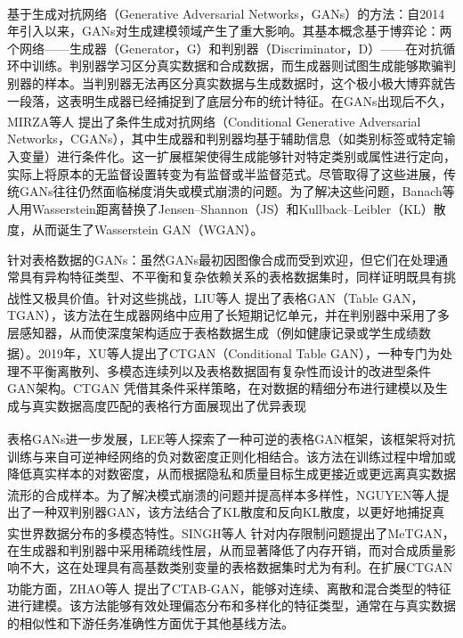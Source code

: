 基于生成对抗网络（Generative Adversarial Networks，GANs）\textsuperscript{\cite{goodfellow2014generative}}的方法：自2014年引入以来，GANs对生成建模领域产生了重大影响。其基本概念基于博弈论：两个网络——生成器（Generator，G）和判别器（Discriminator，D）——在对抗循环中训练。判别器学习区分真实数据和合成数据，而生成器则试图生成能够欺骗判别器的样本。当判别器无法再区分真实数据与生成数据时，这个极小极大博弈就告一段落，这表明生成器已经捕捉到了底层分布的统计特征。在GANs出现后不久，MIRZA等人\textsuperscript{\cite{mirza2014conditional}} 提出了条件生成对抗网络（Conditional Generative Adversarial Networks，CGANs），其中生成器和判别器均基于辅助信息（如类别标签或特定输入变量）进行条件化。这一扩展框架使得生成能够针对特定类别或属性进行定向，实际上将原本的无监督设置转变为有监督或半监督范式。尽管取得了这些进展，传统GANs往往仍然面临梯度消失或模式崩溃的问题。为了解决这些问题，Banach等人用Wasserstein距离替换了Jensen–Shannon（JS）和Kullback–Leibler（KL）散度，从而诞生了Wasserstein GAN（WGAN）\textsuperscript{\cite{adler2018banach,arjovsky2017towards}}。

针对表格数据的GANs：虽然GANs最初因图像合成而受到欢迎，但它们在处理通常具有异构特征类型、不平衡和复杂依赖关系的表格数据集时，同样证明既具有挑战性又极具价值。针对这些挑战，LIU等人\textsuperscript{\cite{xu2018synthesizing}} 提出了表格GAN（Table GAN，TGAN），该方法在生成器网络中应用了长短期记忆单元，并在判别器中采用了多层感知器，从而使深度架构适应于表格数据生成（例如健康记录或学生成绩数据）。2019年，XU等人\textsuperscript{\cite{xu2019modeling}}提出了CTGAN（Conditional Table GAN），一种专门为处理不平衡离散列、多模态连续列以及表格数据固有复杂性而设计的改进型条件GAN架构。CTGAN 凭借其条件采样策略，在对数据的精细分布进行建模以及生成与真实数据高度匹配的表格行方面展现出了优异表现

表格GANs进一步发展，LEE等人\textsuperscript{\cite{lee2021invertible}}探索了一种可逆的表格GAN框架，该框架将对抗训练与来自可逆神经网络的负对数密度正则化相结合。该方法在训练过程中增加或降低真实样本的对数密度，从而根据隐私和质量目标生成更接近或更远离真实数据流形的合成样本。为了解决模式崩溃的问题并提高样本多样性，NGUYEN等人\textsuperscript{\cite{nguyen2017dual}}提出了一种双判别器GAN，该方法结合了KL散度和反向KL散度，以更好地捕捉真实世界数据分布的多模态特性。SINGH等人\textsuperscript{\cite{singh2021metgan}} 针对内存限制问题提出了MeTGAN，在生成器和判别器中采用稀疏线性层，从而显著降低了内存开销，而对合成质量影响不大，这在处理具有高基数类别变量的表格数据集时尤为有利。在扩展CTGAN功能方面，ZHAO等人\textsuperscript{\cite{zhao2021ctab}} 提出了CTAB-GAN，能够对连续、离散和混合类型的特征进行建模。该方法能够有效处理偏态分布和多样化的特征类型，通常在与真实数据的相似性和下游任务准确性方面优于其他基线方法。%

